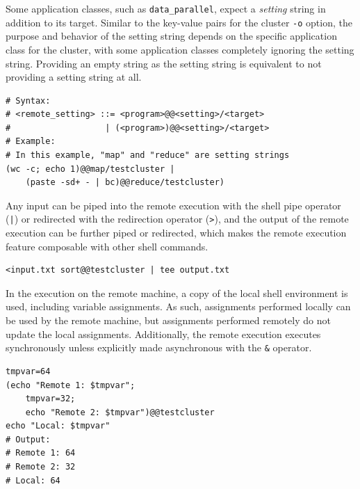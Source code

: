 \documentclass[oneside]{report}
\begin{document}
Some application classes, such as \texttt{data\_parallel}, expect a \textit{setting} string in addition to its target.
Similar to the key-value pairs for the cluster \texttt{-o} option, the purpose and behavior of the setting string depends on the specific application class for the cluster, with some application classes completely ignoring the setting string.
Providing an empty string as the setting string is equivalent to not providing a setting string at all.

\begin{minipage}[c]{\textwidth-15pt}
  \begin{lstlisting}[language=Shard]
# Syntax:
# <remote_setting> ::= <program>@@<setting>/<target>
#                   | (<program>)@@<setting>/<target>
# Example:
# In this example, "map" and "reduce" are setting strings
(wc -c; echo 1)@@map/testcluster |
    (paste -sd+ - | bc)@@reduce/testcluster)
\end{lstlisting}
  \smallskip
\end{minipage}

Any input can be piped into the remote execution with the shell pipe operator (\texttt{|}) or redirected with the redirection operator (\texttt{>}), and the output of the remote execution can be further piped or redirected, which makes the remote execution feature composable with other shell commands.

\begin{minipage}[c]{\textwidth-15pt}
  \begin{lstlisting}[language=Shard]
<input.txt sort@@testcluster | tee output.txt
\end{lstlisting}
  \smallskip
\end{minipage}

In the execution on the remote machine, a copy of the local shell environment is used, including variable assignments.
As such, assignments performed locally can be used by the remote machine, but assignments performed remotely do not update the local assignments.
Additionally, the remote execution executes synchronously unless explicitly made asynchronous with the \texttt{\&} operator.

\begin{minipage}[c]{\textwidth-15pt}
  \begin{lstlisting}[language=Shard]
tmpvar=64
(echo "Remote 1: $tmpvar";
    tmpvar=32;
    echo "Remote 2: $tmpvar")@@testcluster
echo "Local: $tmpvar"
# Output:
# Remote 1: 64
# Remote 2: 32
# Local: 64
\end{lstlisting}
  \smallskip
\end{minipage}
\end{document}
